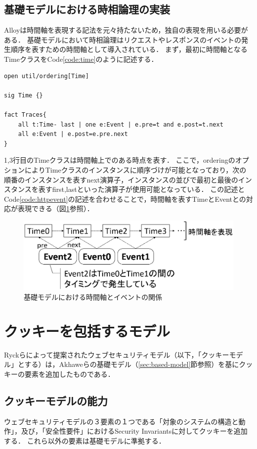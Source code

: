 \documentclass[12pt,a4paper]{jbook}
\begin{document}
\subsection{基礎モデルにおける時相論理の実装}
\label{sec:based-model-temporal-logic}
Alloyは時間軸を表現する記法を元々持たないため，独自の表現を用いる必要がある．
基礎モデルにおいて時相論理はリクエストやレスポンスのイベントの発生順序を表すための時間軸として導入されている．
まず，最初に時間軸となるTimeクラスをCode\ref{code:time}のように記述する．
\begin{lstlisting}[caption=基礎モデルにおける時間軸, label=code:time]
open util/ordering[Time]

sig Time {}

fact Traces{
	all t:Time- last | one e:Event | e.pre=t and e.post=t.next
	all e:Event | e.post=e.pre.next
}
\end{lstlisting}
1,3行目のTimeクラスは時間軸上でのある時点を表す．
ここで，orderingのオプションによりTimeクラスのインスタンスに順序づけが可能となっており，次の順番のインスタンスを表すnext演算子，インスタンスの並びで最初と最後のインスタンスを表すfirst,lastといった演算子が使用可能となっている．
この記述とCode\ref{code:httpevent}の記述を合わせることで，時間軸を表すTimeとEventとの対応が表現できる（図\ref{fig:based-model-temporal-logic}参照）．

\begin{figure}[htb]
\centering
\includegraphics[width=350pt]{./fig/based-model-temporal-logic.eps}
\caption{基礎モデルにおける時間軸とイベントの関係}
\label{fig:based-model-temporal-logic}
\end{figure}

\section{クッキーを包括するモデル}
\label{sec:cookie-model}
Ryckらによって提案されたウェブセキュリティモデル\cite{cookie-model}（以下，「クッキーモデル」とする）は，Akhaweらの基礎モデル（\ref{sec:based-model}節参照）を基にクッキーの要素を追加したものである．

\subsection{クッキーモデルの能力}
ウェブセキュリティモデルの３要素の１つである「対象のシステムの構造と動作」，及び，「安全性要件」におけるSecurity Invariantsに対してクッキーを追加する．
これら以外の要素は基礎モデルに準拠する．
\end{document}
